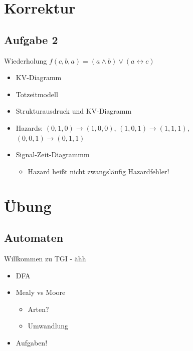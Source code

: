 \documentclass[aspectratio=169,usepdftitle=true,11pt,ngerman,t]{beamer}
\subtitle{Tutorium 9}
\date{14. Juli 2026}
\begin{document}
\section[zu lange Diagramme - ein Experiment]{Korrektur}

\subsection{Aufgabe 2}
\begin{frame}{Wiederholung}\onslide<+->
    \(f(c,b,a)=(a\land b) \lor (a\leftrightarrow c)\)
    \begin{itemize}[<+->]
        \item KV-Diagramm
        \item Totzeitmodell
        \item Strukturausdruck und KV-Diagramm
        \item Hazards: \((0,1,0)\to(1,0,0)\), \((1,0,1)\to(1,1,1)\), \((0,0,1)\to(0,1,1)\)
        \item Signal-Zeit-Diagrammm
        \begin{itemize}[<+->]
            \item Hazard heißt nicht zwangsläufig Hazardfehler!
        \end{itemize}
    \end{itemize}
\end{frame}

\section[Das waren aber wenig Folien!]{Übung}

\subsection{\texorpdfstring{Automaten }{Automaten}}
\begin{frame}{Willkommen zu TGI - ähh}\onslide<+->
    \begin{itemize}[<+->]
        \item DFA
        \item Mealy vs Moore
        \begin{itemize}[<+->]
            \item Arten?
            \item Umwandlung
        \end{itemize}
        \vspace*{\baselineskip}
        \item Aufgaben!
    \end{itemize}
\end{frame}
\end{document}
